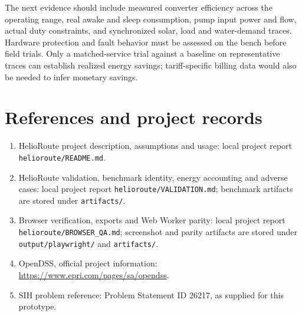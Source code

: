 \documentclass[11pt]{article}
\begin{document}
The next evidence should include measured converter efficiency across the operating range, real awake and sleep consumption, pump input power and flow, actual duty constraints, and synchronized solar, load and water-demand traces. Hardware protection and fault behavior must be assessed on the bench before field trials. Only a matched-service trial against a baseline on representative traces can establish realized energy savings; tariff-specific billing data would also be needed to infer monetary savings.

\section*{References and project records}
\begin{enumerate}[label={\arabic*.}]
\item HelioRoute project description, assumptions and usage: local project report \texttt{helioroute/README.md}.
\item HelioRoute validation, benchmark identity, energy accounting and adverse cases: local project report \texttt{helioroute/VALIDATION.md}; benchmark artifacts are stored under \texttt{artifacts/}.
\item Browser verification, exports and Web Worker parity: local project report \texttt{helioroute/BROWSER\_QA.md}; screenshot and parity artifacts are stored under \texttt{output/playwright/} and \texttt{artifacts/}.
\item OpenDSS, official project information: \url{https://www.epri.com/pages/sa/opendss}.
\item SIH problem reference: Problem Statement ID 26217, as supplied for this prototype.
\end{enumerate}
\end{document}
